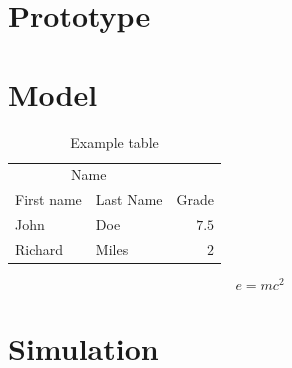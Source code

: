 \documentclass[twoside,twocolumn]{article}
\begin{document}
\section{Prototype}

\blindtext %

\section{Model}

\begin{table}
\caption{Example table}
\centering
\begin{tabular}{llr}
\toprule
\multicolumn{2}{c}{Name} \\
\cmidrule(r){1-2}
First name & Last Name & Grade \\
\midrule
John & Doe & $7.5$ \\
Richard & Miles & $2$ \\
\bottomrule
\end{tabular}
\end{table}

\begin{equation}
\label{eq:emc}
e = mc^2
\end{equation}

\blindtext %


\section{Simulation}

\blindtext %

\end{document}
